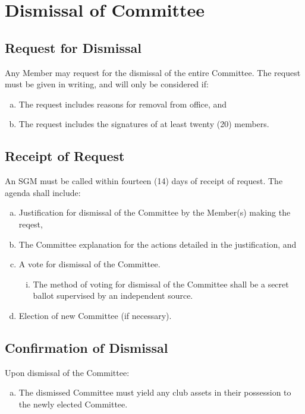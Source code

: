 \documentclass[a4paper,12pt]{article}
\begin{document}
\section{Dismissal of Committee}

\subsection{Request for Dismissal}

Any Member may request for the dismissal of the entire Committee. The request must be given in writing, and will only be considered if:

\begin{enumerate}[a)]
	\item The request includes reasons for removal from office, and
	\item The request includes the signatures of at least twenty (20) members.
\end{enumerate}

\subsection{Receipt of Request}

An SGM must be called within fourteen (14) days of receipt of request. The agenda shall include:

\begin{enumerate}[a)]
	\item Justification for dismissal of the Committee by the Member(s) making the reqest,
	\item The Committee explanation for the actions detailed in the justification, and
	\item A vote for dismissal of the Committee.
	\begin{enumerate}[i)]
		\item The method of voting for dismissal of the Committee shall be a secret ballot supervised by an independent source.
	\end{enumerate}
	\item Election of new Committee (if necessary).
\end{enumerate}

\subsection{Confirmation of Dismissal}

Upon dismissal of the Committee:

\begin{enumerate}[a)]
	\item The dismissed Committee must yield any club assets in their possession to the newly elected Committee.
\end{enumerate}
\end{document}
